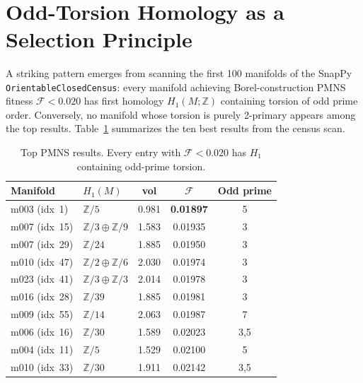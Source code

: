 \documentclass[floatfix,aps,prd,twocolumn,showpacs,superscriptaddress,longbibliography]{revtex4-2}
\begin{document}
﻿%
\section{Odd-Torsion Homology as a Selection Principle}
\label{sec:homology}

A striking pattern emerges from scanning the first 100 manifolds of
the SnapPy \texttt{OrientableClosedCensus}: every manifold achieving
Borel-construction PMNS fitness $\mathcal{F} < 0.020$ has first
homology $H_1(M;\mathbb{Z})$ containing torsion of odd prime order.
Conversely, no manifold whose torsion is purely 2-primary appears
among the top results. Table~\ref{tab:homology_pattern} summarizes
the ten best results from the census scan.

\begin{table}[!t]
\centering
\caption{Top PMNS results. Every entry with $\mathcal{F} < 0.020$
has $H_1$ containing odd-prime torsion.}
\label{tab:homology_pattern}
\begin{tabular}{llccc}
\toprule
Manifold & $H_1(M)$ & vol & $\mathcal{F}$ & Odd prime \\
\midrule
m003 (idx~1)  & $\mathbb{Z}/5$                     & 0.981 & \textbf{0.01897} & 5 \\
m007 (idx~15) & $\mathbb{Z}/3\oplus\mathbb{Z}/9$   & 1.583 & 0.01935 & 3 \\
m007 (idx~29) & $\mathbb{Z}/24$                    & 1.885 & 0.01950 & 3 \\
m010 (idx~47) & $\mathbb{Z}/2\oplus\mathbb{Z}/6$   & 2.030 & 0.01974 & 3 \\
m023 (idx~41) & $\mathbb{Z}/3\oplus\mathbb{Z}/3$   & 2.014 & 0.01978 & 3 \\
m016 (idx~28) & $\mathbb{Z}/39$                    & 1.885 & 0.01981 & 3 \\
m009 (idx~55) & $\mathbb{Z}/14$                    & 2.063 & 0.01987 & 7 \\
m006 (idx~16) & $\mathbb{Z}/30$                    & 1.589 & 0.02023 & 3,5 \\
m004 (idx~11) & $\mathbb{Z}/5$                     & 1.529 & 0.02100 & 5 \\
m010 (idx~33) & $\mathbb{Z}/30$                    & 1.911 & 0.02142 & 3,5 \\
\bottomrule
\end{tabular}
\end{table}
\end{document}
